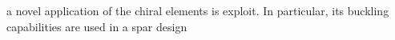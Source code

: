 
  a novel application of the chiral elements is exploit. In particular, its buckling capabilities are used in a spar design 

